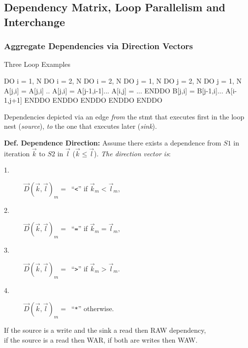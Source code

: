 \documentclass{beamer}
\newcommand{\emp}[1]{\textcolor{DikuRed}{ #1}}
\begin{document}
\subsection{Dependency Matrix, Loop Parallelism and Interchange}
\begin{frame}[fragile,t]
  \frametitle{Aggregate Dependencies via Direction Vectors} %

\begin{block}{Three Loop Examples}
\begin{colorcode}
DO i = 1, N            DO i = 2, N               DO i = 2, N
 DO j = 1, N            DO j = 2, N               DO j = 1, N 
   A[j,i] = A[j,i] ..     A[j,i] = A[j-1,i-1]...   A[i,j] = ...
 ENDDO                    B[j,i] = B[j-1,i]...       A[i-1,j+1]
ENDDO                  ENDDO ENDDO               ENDDO ENDDO
\end{colorcode}
\end{block} 

\smallskip

Dependencies depicted via an edge {\em from} the stmt that executes first
in the loop nest ({\em source}), {\em to} the one that executes later ({\em sink}).

\smallskip

{\bf Def. Dependence Direction:} Assume there exists a dependence from $S1$
in iteration $\vec{k}$ to $S2$ in $\vec{l}$ ($\vec{k}\leq\vec{l}$). 
\emp{\em The direction vector is}:
\begin{description}
    \item[1.] $\vec{D}(\vec{k},\vec{l})_m = $~``{\tt{}<}'' if $\vec{k}_m < \vec{l}_m$,
    \item[2.] $\vec{D}(\vec{k},\vec{l})_m = $~``{\tt{}=}'' if $\vec{k}_m = \vec{l}_m$,
    \item[3.] $\vec{D}(\vec{k},\vec{l})_m = $~``{\tt{}>}'' if $\vec{k}_m > \vec{l}_m$.
    \item[4.] $\vec{D}(\vec{k},\vec{l})_m = $~``{\tt{}*}'' otherwise.
\end{description}

\medskip
If the source is a write and the sink a read then RAW dependency,\\
if the source is a read then WAR, if both are writes then WAW.  
\end{frame}
\end{document}
